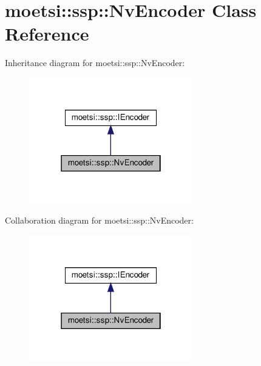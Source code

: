 \hypertarget{classmoetsi_1_1ssp_1_1NvEncoder}{}\section{moetsi\+:\+:ssp\+:\+:Nv\+Encoder Class Reference}
\label{classmoetsi_1_1ssp_1_1NvEncoder}


Inheritance diagram for moetsi\+:\+:ssp\+:\+:Nv\+Encoder\+:\nopagebreak
\begin{figure}[H]
\begin{center}
\leavevmode
\includegraphics[width=202pt]{classmoetsi_1_1ssp_1_1NvEncoder__inherit__graph}
\end{center}
\end{figure}


Collaboration diagram for moetsi\+:\+:ssp\+:\+:Nv\+Encoder\+:\nopagebreak
\begin{figure}[H]
\begin{center}
\leavevmode
\includegraphics[width=202pt]{classmoetsi_1_1ssp_1_1NvEncoder__coll__graph}
\end{center}
\end{figure}
